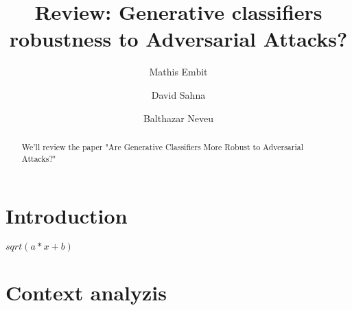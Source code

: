\documentclass[sigconf]{acmart}
\begin{document}
\title{Review: Generative classifiers robustness to Adversarial Attacks?}


\author{Mathis Embit}

\author{David Sahna}

\author{Balthazar Neveu}


\renewcommand{\shortauthors}{MVA et al.}

\begin{abstract}
  We'll review the paper "Are Generative Classifiers More Robust to Adversarial Attacks?" \cite{li2019}
\end{abstract}





\maketitle

\section{Introduction}


\cite{li2019}
$sqrt(a*x+b)$

\section{Context analyzis}



\end{document}
